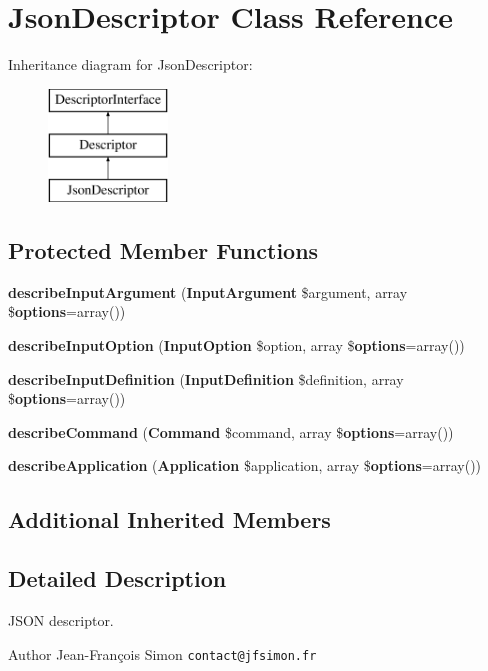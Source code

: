 \section{Json\+Descriptor Class Reference}
\label{class_symfony_1_1_component_1_1_console_1_1_descriptor_1_1_json_descriptor}
Inheritance diagram for Json\+Descriptor\+:\begin{figure}[H]
\begin{center}
\leavevmode
\includegraphics[height=3.000000cm]{class_symfony_1_1_component_1_1_console_1_1_descriptor_1_1_json_descriptor}
\end{center}
\end{figure}
\subsection*{Protected Member Functions}
\begin{DoxyCompactItemize}
\item 
{\bf describe\+Input\+Argument} ({\bf Input\+Argument} \$argument, array \${\bf options}=array())
\item 
{\bf describe\+Input\+Option} ({\bf Input\+Option} \$option, array \${\bf options}=array())
\item 
{\bf describe\+Input\+Definition} ({\bf Input\+Definition} \$definition, array \${\bf options}=array())
\item 
{\bf describe\+Command} ({\bf Command} \$command, array \${\bf options}=array())
\item 
{\bf describe\+Application} ({\bf Application} \$application, array \${\bf options}=array())
\end{DoxyCompactItemize}
\subsection*{Additional Inherited Members}


\subsection{Detailed Description}
J\+S\+O\+N descriptor.

\begin{DoxyAuthor}{Author}
Jean-\/\+François Simon {\tt contact@jfsimon.\+fr} 
\end{DoxyAuthor}


